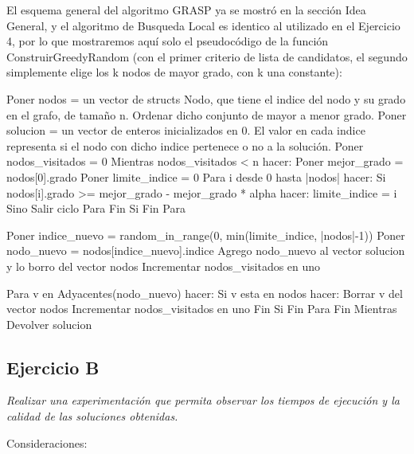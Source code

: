 El esquema general del algoritmo GRASP ya se mostró en la sección Idea General, y el algoritmo de Busqueda Local es identico al utilizado en el Ejercicio 4, por lo que mostraremos aquí solo el pseudocódigo de la función ConstruirGreedyRandom (con el primer criterio de lista de candidatos, el segundo simplemente elige los k nodos de mayor grado, con k una constante):

\begin{codesnippet}
Poner nodos = un vector de structs Nodo, que tiene el indice del nodo y su grado
    en el grafo, de tamaño n.
Ordenar dicho conjunto de mayor a menor grado.
Poner solucion = un vector de enteros inicializados en 0. El valor en cada indice
    representa si el nodo con dicho indice pertenece o no a la solución.
Poner nodos_visitados = 0
Mientras nodos_visitados < n hacer:
    Poner mejor_grado = nodos[0].grado
    Poner limite_indice = 0
    Para i desde 0 hasta |nodos| hacer:
        Si nodos[i].grado >= mejor_grado - mejor_grado * alpha hacer:
            limite_indice = i
        Sino
            Salir ciclo Para
        Fin Si
    Fin Para

    Poner indice_nuevo = random_in_range(0, min(limite_indice, |nodos|-1))
    Poner nodo_nuevo = nodos[indice_nuevo].indice
    Agrego nodo_nuevo al vector solucion y lo borro del vector nodos
    Incrementar nodos_visitados en uno

    Para v en Adyacentes(nodo_nuevo) hacer:
        Si v esta en nodos hacer:
            Borrar v del vector nodos
            Incrementar nodos_visitados en uno
        Fin Si
    Fin Para
Fin Mientras
Devolver solucion
\end{codesnippet}

\subsection{Ejercicio B}

\textit{Realizar una experimentación que permita observar los tiempos de ejecución y la calidad de las soluciones obtenidas.}

\medskip

Consideraciones:

